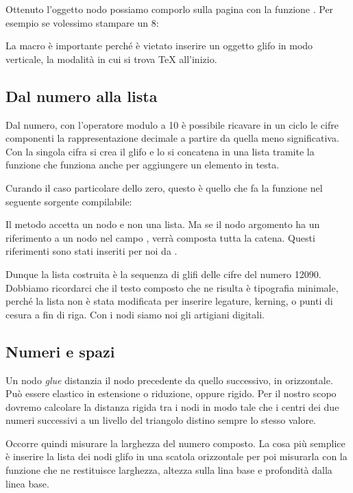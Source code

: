 Ottenuto l'oggetto nodo possiamo comporlo sulla pagina con la funzione
. Per esempio se volessimo stampare un 8:

La macro  è importante perché è vietato inserire un oggetto glifo
in modo verticale, la modalità in cui si trova \TeX{} all'inizio.


\subsection{Dal numero alla lista}

Dal numero, con l'operatore modulo a 10 è possibile ricavare in un ciclo le
cifre componenti la rappresentazione decimale a partire da quella meno
significativa. Con la singola cifra si crea il glifo e lo si concatena in una
lista tramite la funzione  che funziona anche per
aggiungere un elemento in testa.

Curando il caso particolare dello zero, questo è quello che fa la funzione
 nel seguente sorgente compilabile:

Il metodo  accetta un nodo e non una lista. Ma se il nodo
argomento ha un riferimento a un nodo nel campo , verrà composta
tutta la catena. Questi riferimenti sono stati inseriti per noi da
.

Dunque la lista costruita è la sequenza di glifi delle cifre del numero 12090.
Dobbiamo ricordarci che il testo composto che ne risulta è tipografia minimale,
perché la lista non è stata modificata per inserire legature, kerning, o punti
di cesura a fin di riga. Con i nodi siamo noi gli artigiani digitali.


\subsection{Numeri e spazi}

Un nodo \emph{glue} distanzia il nodo precedente da quello successivo, in
orizzontale. Può essere elastico in estensione o riduzione, oppure rigido.
Per il nostro scopo dovremo calcolare la distanza rigida tra i nodi in modo
tale che i centri dei due numeri successivi a un livello del triangolo distino
sempre lo stesso valore.

Occorre quindi misurare la larghezza del numero composto. La cosa più semplice è
inserire la lista dei nodi glifo in una scatola orizzontale per poi misurarla
con la funzione  che ne restituisce larghezza, altezza sulla
lina base e profondità dalla linea base.

